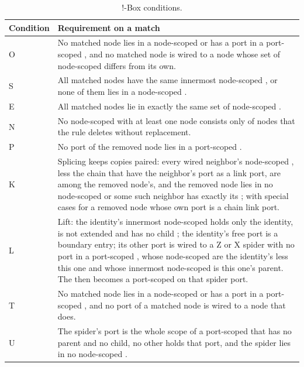 \begin{table}[H]
\centering\small
\begin{tabularx}{\linewidth}{@{}l>{\raggedright\arraybackslash}X@{}}
\toprule
Condition & Requirement on a match \\
\midrule
O & No matched node lies in a node-scoped \bbox{} or has a port in a port-scoped \bbox{}, and no matched node is wired to a node whose set of node-scoped \bboxes{} differs from its own. \\
S & All matched nodes have the same innermost node-scoped \bbox{}, or none of them lies in a node-scoped \bbox{}. \\
E & All matched nodes lie in exactly the same set of node-scoped \bboxes{}. \\
N & No node-scoped \bbox{} with at least one node consists only of nodes that the rule deletes without replacement. \\
P & No port of the removed node lies in a port-scoped \bbox{}. \\
K & Splicing keeps copies paired: every wired neighbor's node-scoped \bboxes{}, less the chain \bboxes{} that have the neighbor's port as a link port, are among the removed node's, and the removed node lies in no node-scoped \bbox{} or some such neighbor has exactly its \bboxes{}; with special cases for a removed node whose own port is a chain link port. \\
L & Lift: the identity's innermost node-scoped \bbox{} holds only the identity, is not extended and has no child \bbox{}; the identity's free port is a boundary entry; its other port is wired to a Z or X spider with no port in a port-scoped \bbox{}, whose node-scoped \bboxes{} are the identity's less this one and whose innermost node-scoped \bbox{} is this one's parent. The \bbox{} then becomes a port-scoped \bbox{} on that spider port. \\
T & No matched node lies in a node-scoped \bbox{} or has a port in a port-scoped \bbox{}, and no port of a matched node is wired to a node that does. \\
U & The spider's port is the whole scope of a port-scoped \bbox{} that has no parent and no child, no other \bbox{} holds that port, and the spider lies in no node-scoped \bbox{}. \\
\bottomrule
\end{tabularx}
\caption{!-Box conditions.}
\label{tab:box-conditions}
\end{table}

